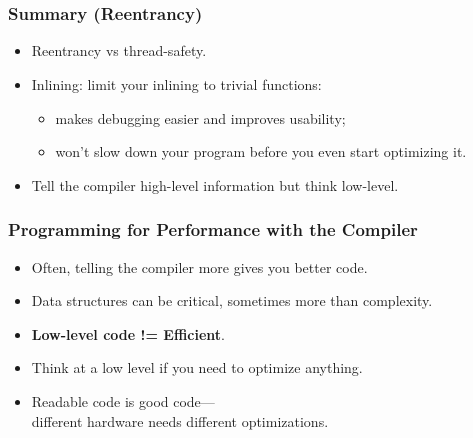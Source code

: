 \section{}

\begin{frame}
  \frametitle{Summary (Reentrancy)}


  \begin{itemize}
    \item Reentrancy vs thread-safety.
    \item Inlining: limit your inlining to trivial functions:
      \begin{itemize}
        \item makes debugging easier and improves usability;
        \item won't slow down your program before you even start optimizing it.
      \end{itemize}
    \item Tell the compiler high-level information but think low-level.
  \end{itemize}
  
\end{frame}

\begin{frame}
  \frametitle{Programming for Performance with the Compiler}

  

  \begin{itemize}
    \item Often, telling the compiler more gives you better code.
    \vfill
    \item Data structures can be critical, sometimes more than complexity.
    \vfill
    \item {\bf Low-level code != Efficient}.
    \vfill
    \item Think at a low level if you need to optimize anything.
    \vfill
    \item Readable code is good code---\\ different hardware needs different
      optimizations.
  \end{itemize}
  
\end{frame}



